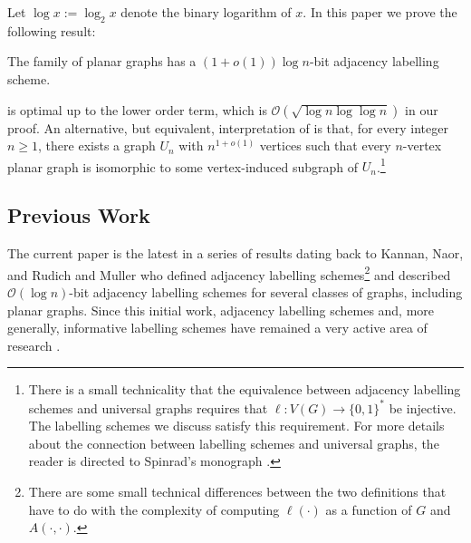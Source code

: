 \documentclass[kpfonts]{patmorin}
\newcommand{\Oh}{\mathcal{O}}
\let\ge\geqslant
\begin{document}
Let $\log x:=\log_2 x$ denote the binary logarithm of $x$.
In this paper we prove the following result:
\begin{thm}
  The family of planar graphs has a $(1+o(1))\log n$-bit adjacency labelling scheme.
\end{thm}


 is optimal up to the lower order term,
which is $\Oh\left(\sqrt{\log n\log\log n}\right)$ in our proof.
An alternative, but equivalent, interpretation of  is that, for every integer $n\ge 1$, there exists a graph $U_n$ with $n^{1+o(1)}$  vertices such that every $n$-vertex planar graph is isomorphic to some vertex-induced subgraph of $U_n$.\footnote{There is a small technicality that the equivalence between adjacency labelling schemes and universal graphs requires that $\ell:V(G)\to\{0,1\}^*$ be injective.  The labelling schemes we discuss satisfy this requirement.  For more details about the connection between labelling schemes and universal graphs, the reader is directed to Spinrad's monograph \cite[Section~2.1]{spinrad:efficient}.}

\subsection{Previous Work}

The current paper is the latest in a series of results dating back to Kannan, Naor, and Rudich \cite{kannan.naor.ea:implicit0,kannan.naor.ea:implicit} and Muller \cite{muller:local} who defined adjacency labelling schemes\footnote{There are some small technical differences between the two definitions that have to do with the complexity of computing $\ell(\cdot)$ as a function of $G$ and
$A(\cdot,\cdot)$.} and described $\Oh(\log n)$-bit adjacency labelling schemes for several classes of graphs, including planar graphs.  Since this initial work, adjacency labelling schemes and, more generally, informative labelling schemes have remained a very active area of research \cite{adjiashvili.rotbart:labeling,alstrup.kaplan.ea:adjacency,abrahamsen.alstrup.ea:near-optimal,alstrup.dahlgaard.ea:sublinear,alstrup.gortz.ea:distance,alstrup.gavoille.ea:simpler,alstrup.rauhe:improved}.
\end{document}
